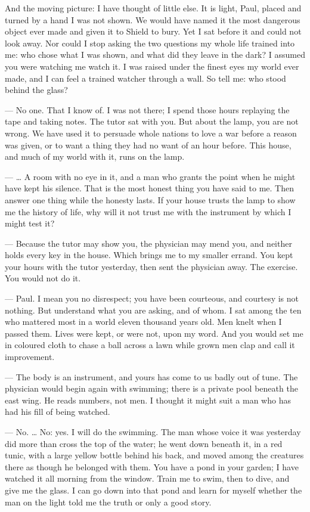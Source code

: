 \begin{room}
And the moving picture: I have thought of little else. It is light, Paul, placed and turned by a hand I was not shown. We would have named it the most dangerous object ever made and given it to Shield to bury. Yet I sat before it and could not look away. Nor could I stop asking the two questions my whole life trained into me: who chose what I was shown, and what did they leave in the dark? I assumed you were watching me watch it. I was raised under the finest eyes my world ever made, and I can feel a trained watcher through a wall. So tell me: who stood behind the glass?

--- No one. That I know of. I was not there; I spend those hours replaying the tape and taking notes. The tutor sat with you. But about the lamp, you are not wrong. We have used it to persuade whole nations to love a war before a reason was given, or to want a thing they had no want of an hour before. This house, and much of my world with it, runs on the lamp.

--- \ldots{} A room with no eye in it, and a man who grants the point when he might have kept his silence. That is the most honest thing you have said to me. Then answer one thing while the honesty lasts. If your house trusts the lamp to show me the history of life, why will it not trust me with the instrument by which I might test it?

--- Because the tutor may show you, the physician may mend you, and neither holds every key in the house. Which brings me to my smaller errand. You kept your hours with the tutor yesterday, then sent the physician away. The exercise. You would not do it.

--- Paul. I mean you no disrespect; you have been courteous, and courtesy is not nothing. But understand what you are asking, and of whom. I sat among the ten who mattered most in a world eleven thousand years old. Men knelt when I passed them. Lives were kept, or were not, upon my word. And you would set me in coloured cloth to chase a ball across a lawn while grown men clap and call it improvement.

--- The body is an instrument, and yours has come to us badly out of tune. The physician would begin again with swimming; there is a private pool beneath the east wing. He reads numbers, not men. I thought it might suit a man who has had his fill of being watched.

--- No. \ldots{} No: yes. I will do the swimming. The man whose voice it was yesterday did more than cross the top of the water; he went down beneath it, in a red tunic, with a large yellow bottle behind his back, and moved among the creatures there as though he belonged with them. You have a pond in your garden; I have watched it all morning from the window. Train me to swim, then to dive, and give me the glass. I can go down into that pond and learn for myself whether the man on the light told me the truth or only a good story.


\end{room}
